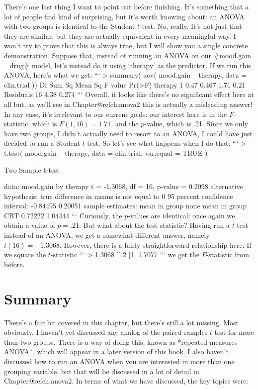 There's one last thing I want to point out before finishing. It's something that a lot of people find kind of surprising, but it's worth knowing about: an ANOVA with two groups is identical to the Student $t$-test. No, really. It's not just that they are similar, but they are actually equivalent in every meaningful way. I won't try to prove that this is always true, but I will show you a single concrete demonstration. Suppose that, instead of running an ANOVA on our \rtextverb#mood.gain ~ drug# model, let's instead do it using `therapy` as the predictor. If we run this ANOVA, here's what we get:
```
> summary( aov( mood.gain ~ therapy, data = clin.trial ))
            Df Sum Sq Mean Sq F value Pr(>F)
therapy      1   0.47   0.467    1.71   0.21
Residuals   16   4.38   0.274
```
Overall, it looks like there's no significant effect here at all but, as we'll see in Chapter@refch:anova2 this is actually a misleading  answer! In any case, it's irrelevant to our current goals: our interest here is in the $F$-statistic, which is $F(1,16) = 1.71$, and the $p$-value, which is .21. Since we only have two groups, I didn't actually need to resort to an ANOVA, I could have just decided to run a Student $t$-test. So let's see what happens when I do that:
```
> t.test( mood.gain ~ therapy, data = clin.trial, var.equal = TRUE )

	Two Sample t-test

data:  mood.gain by therapy 
t = -1.3068, df = 16, p-value = 0.2098
alternative hypothesis: true difference in means is not equal to 0 
95 percent confidence interval:
 -0.84495  0.20051 
sample estimates:
mean in group none  mean in group CBT 
           0.72222            1.04444 
```
Curiously, the $p$-values are identical: once again we obtain a value of $p = .21$. But what about the test statistic? Having run a $t$-test instead of an ANOVA, we get a somewhat different answer, namely $t(16) = -1.3068$. However, there is a fairly straightforward relationship here. If we square the $t$-statistic
```
> 1.3068 ^ 2
[1] 1.7077
```
we get the $F$-statistic from before.




\section{Summary}

There's a fair bit covered in this chapter, but there's still a lot missing. Most obviously, I haven't yet discussed any analog of the paired samples $t$-test for more than two groups. There is a way of doing this, known as *repeated measures ANOVA*, which will appear in a later version of this book. I also haven't discussed how to run an ANOVA when you are interested in more than one grouping variable, but that will be discussed in a lot of detail in Chapter@refch:anova2. In terms of what we have discussed, the key topics were:

